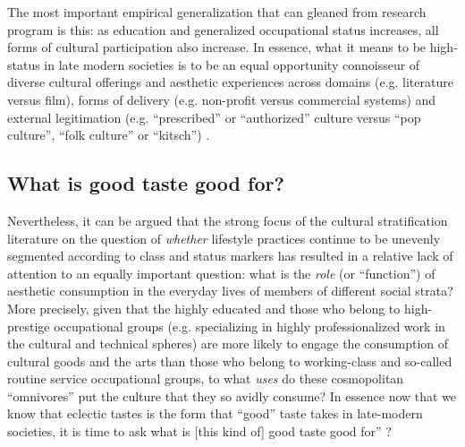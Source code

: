 The most important empirical generalization that can gleaned from research program is this: as education and generalized occupational status increases, all forms of cultural participation also increase.  In essence, what it means to be high-status in late modern societies is to be an equal opportunity connoisseur of diverse cultural offerings and aesthetic experiences across domains (e.g. literature versus film), forms of delivery (e.g. non-profit versus commercial systems) and external legitimation (e.g. ``prescribed'' or ``authorized'' culture versus ``pop culture'', ``folk culture'' or ``kitsch'') \citep{peterson92, peterson_kern96, ollivier08, warde_etal08, sullivan_katzgerro07, vaneijck01, dimaggio_mukhtar04}.

\subsection{What is good taste good for?}
Nevertheless, it can be argued that the strong focus of the cultural stratification literature on the question of \emph{whether} lifestyle practices continue to be unevenly segmented according to class and status markers has resulted in a relative lack of attention to an equally important question:  what is the \emph{role} (or ``function'') of aesthetic consumption in the everyday lives of members of different social strata? More precisely, given that the highly educated and those who belong to high-prestige occupational groups (e.g. specializing in highly professionalized work in the cultural and technical spheres) are more likely to engage the consumption of cultural goods and the arts than those who belong to working-class and so-called routine service occupational groups, to what \emph{uses} do these cosmopolitan ``omnivores'' \citep{ollivier08} put the culture that they so avidly consume? In essence now that we know that eclectic tastes is the form that ``good'' taste takes in late-modern societies, it is time to ask what is [this kind of] good taste good for'' \citep{erickson91}?

